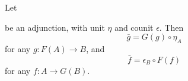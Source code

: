 \documentclass[11pt,a4paper]{article}
\begin{document}
\begin{lemma}
    Let  be an adjunction, with unit $\eta$ and counit $\epsilon$. Then
    \begin{equation*}
        \bar{g} = G(g)\circ \eta_A
    \end{equation*}
    for any $g: F(A)\to B$, and
    \begin{equation*}
        \bar{f} = \epsilon_B\circ F(f)
    \end{equation*}
    for any $f: A\to G(B)$.
\end{lemma}
\end{document}
